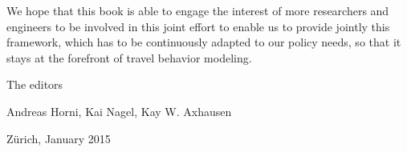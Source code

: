 We hope that this book is able to engage the interest of more researchers and engineers to be involved in this joint effort to enable us to provide jointly this framework, which has to be continuously adapted to our policy needs, so that it stays at the forefront of travel behavior modeling.

The editors

Andreas Horni, 	Kai Nagel,		Kay W. Axhausen


Zürich, January 2015

